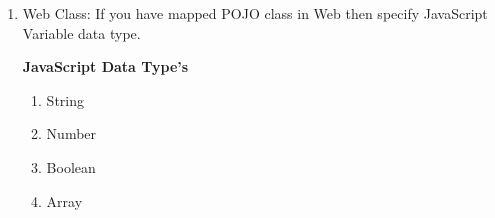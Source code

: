 \begin{enumerate}
\begin{enumerate}
\begin{center}
{{\begin{enumerate}
\begin{enumerate}
						\item \small java.lang.long

						\item \small java.lang.Long

						\item \small java.lang.float

						\item \small java.lang.Float

						\item \small java.lang.boolean

						\item \small java.lang.Boolean

						\item \small java.lang.char

						\item \small java.lang.Character

						\item \small java.lang.String

						\item \small java.lang.byte

						\item \small java.lang.Byte

						\item \small java.lang.void

						\item \small java.lang.Void

						\item \small java.lang.short

						\item \small java.lang.Short

					\end{enumerate} 
						
				
					\item \small Web Class: If you have mapped POJO class in Web then specify JavaScript Variable data type.

					\textbf{JavaScript Data Type's}
					\begin{enumerate}

						\item \small String								

						\item \small Number								

						\item \small Boolean								

						\item \small Array								


\end{enumerate}
\end{enumerate}}}
\end{center}
\end{enumerate}
\end{enumerate}
